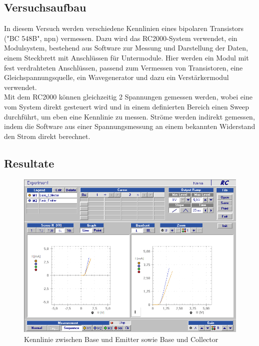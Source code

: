 \documentclass[12pt,a4paper]{article}
\begin{document}
\begin{multicols}{2}
\subsection{Versuchsaufbau}

In diesem Versuch werden verschiedene Kennlinien eines bipolaren Transistors ("BC 548B", npn) vermessen. Dazu wird das RC2000-System verwendet, ein Modulsystem, bestehend aus Software zur Messung und Darstellung der Daten, einem Steckbrett mit Anschlüssen für Untermodule. Hier werden ein Modul mit fest verdrahteten Anschlüssen, passend zum Vermessen von Transistoren, eine Gleichspannungsquelle, ein Wavegenerator und dazu ein Verstärkermodul verwendet.\\
Mit dem RC2000 können gleichzeitig 2 Spannungen gemessen werden, wobei eine vom System direkt gesteuert wird und in einem definierten Bereich einen Sweep durchführt, um eben eine Kennlinie zu messen. Ströme werden indirekt gemessen, indem die Software aus einer Spannungsmessung an einem bekannten Widerstand den Strom direkt berechnet.\\





\subsection{Resultate}

\end{multicols}
\begin{figure}[H]
	\centering
	\includegraphics[scale=0.45]{./data/Braun_Kurz_PS8/Kennlinien_Emitter_Collector.png}
	\caption{Kennlinie zwischen Base und Emitter sowie Base und Collector}
	\label{fig:kenn_emit_coll}
\end{figure}
\end{document}
